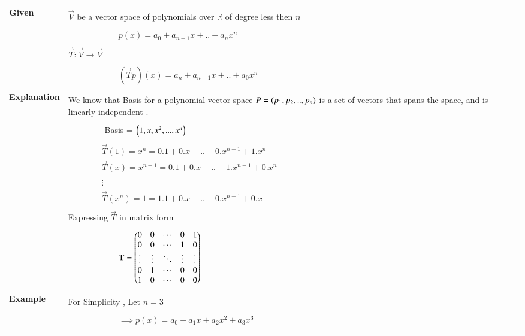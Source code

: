 \begin{longtable}{|p{5cm}|p{13cm}|}
\hline
\endhead
    \multirow{3}{*}{\textbf{Given}} 
     &\\
     & $\vec{V}$ be a vector space of polynomials over $\mathbb{R}$ of degree less then $n$ \\
     &\\
     &$\qquad\qquad\qquad p(x)=a_0+a_{n-1}x+..+a_nx^{n}$\\
     &\\
     & $\vec{T}: \vec{V} \rightarrow \vec{V}$\\
     &\\
     & $\qquad\qquad\qquad(\vec{T}p)(x)=a_n+a_{n-1}x+..+a_0x^{n}$\\
     &\\
     \hline
     \multirow{3}{*}{\textbf{Explanation}}&\\
     & We know that Basis for a polynomial vector space $P=\left(p_1,p_2,..,p_n\right)$ is a set of vectors that spans the space, and is linearly independent .\\
     &\\
     &$\qquad\qquad$  Basis = $\left(1,x,x^2,...,x^{n}\right)$\\
     &\\
     & $\qquad\qquad\vec{T}(1) = x^{n} = 0.1+0.x+..+0.x^{n-1}+1.x^n$\\
     & $\qquad\qquad\vec{T}(x) = x^{n-1} = 0.1+0.x+..+1.x^{n-1}+0.x^{n}$\\
     & $\qquad\qquad\vdots$\\
     & $\qquad\qquad\vec{T}(x^{n}) = 1 = 1.1+0.x+..+0.x^{n-1}+0.x $\\
     &\\
     & Expressing $\vec{T}$ in matrix form\\
     &\\
     & $\qquad\qquad\qquad\mathbf{T}=\begin{pmatrix}0&0&\cdots&0&1\\0&0&\cdots&1&0\\\vdots&\vdots&\ddots&\vdots&\vdots\\0&1&\cdots&0&0\\1&0&\cdots&0&0\end{pmatrix}$\\ 
     &\\
    \hline
    \multirow{3}{*}{\textbf{Example} }
	& \\
	& For Simplicity , Let $n=3$\\
	&\\
	& $\qquad\qquad\qquad\implies p(x)=a_0+a_1x+a_2x^{2}+a_3x^{3}$\\
	&\\

\end{longtable}
